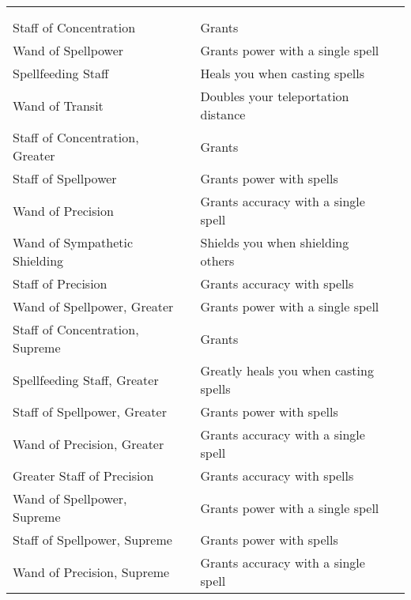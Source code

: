 
\begin{longtabuwrapper}
\begin{longtabu}{l l X l}
 \\
 &  &  &  \\
\bottomrule
Staff of Concentration &  & Grants   & \pageref{item:Staff of Concentration} \\
Wand of Spellpower &  & Grants  power with a single spell & \pageref{item:Wand of Spellpower} \\
Spellfeeding Staff &  & Heals you when casting spells & \pageref{item:Spellfeeding Staff} \\
Wand of Transit &  & Doubles your teleportation distance & \pageref{item:Wand of Transit} \\
Staff of Concentration, Greater &  & Grants   & \pageref{item:Staff of Concentration, Greater} \\
Staff of Spellpower &  & Grants  power with spells & \pageref{item:Staff of Spellpower} \\
Wand of Precision &  & Grants  accuracy with a single spell & \pageref{item:Wand of Precision} \\
Wand of Sympathetic Shielding &  & Shields you when shielding others & \pageref{item:Wand of Sympathetic Shielding} \\
Staff of Precision &  & Grants  accuracy with spells & \pageref{item:Staff of Precision} \\
Wand of Spellpower, Greater &  & Grants  power with a single spell & \pageref{item:Wand of Spellpower, Greater} \\
Staff of Concentration, Supreme &  & Grants   & \pageref{item:Staff of Concentration, Supreme} \\
Spellfeeding Staff, Greater &  & Greatly heals you when casting spells & \pageref{item:Spellfeeding Staff, Greater} \\
Staff of Spellpower, Greater &  & Grants  power with spells & \pageref{item:Staff of Spellpower, Greater} \\
Wand of Precision, Greater &  & Grants  accuracy with a single spell & \pageref{item:Wand of Precision, Greater} \\
Greater Staff of Precision &  & Grants  accuracy with spells & \pageref{item:Greater Staff of Precision} \\
Wand of Spellpower, Supreme &  & Grants  power with a single spell & \pageref{item:Wand of Spellpower, Supreme} \\
Staff of Spellpower, Supreme &  & Grants  power with spells & \pageref{item:Staff of Spellpower, Supreme} \\
Wand of Precision, Supreme &  & Grants  accuracy with a single spell & \pageref{item:Wand of Precision, Supreme} \\
\end{longtabu}
\end{longtabuwrapper}

